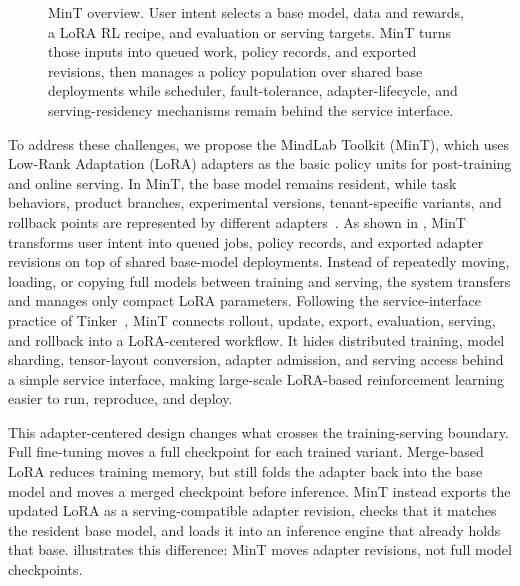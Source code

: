 \documentclass{llmxive}
\begin{document}
\begin{figure}[!htbp]
{}
    \caption{MinT overview. User intent selects a base model, data and rewards, a LoRA RL recipe, and evaluation or serving targets. MinT turns those inputs into queued work, policy records, and exported revisions, then manages a policy population over shared base deployments while scheduler, fault-tolerance, adapter-lifecycle, and serving-residency mechanisms remain behind the service interface.}
    \label{fig:mint_overview}
\end{figure}

To address these challenges, we propose the MindLab Toolkit (MinT), which uses Low-Rank Adaptation (LoRA) adapters as the basic policy units for post-training and online serving. In MinT, the base model remains resident, while task behaviors, product branches, experimental versions, tenant-specific variants, and rollback points are represented by different adapters~\citep{lora2022,lora_without_regret_2025}. As shown in , MinT transforms user intent into queued jobs, policy records, and exported adapter revisions on top of shared base-model deployments. Instead of repeatedly moving, loading, or copying full models between training and serving, the system transfers and manages only compact LoRA parameters. Following the service-interface practice of Tinker~\citep{tinker2025,tinker_cookbook}, MinT connects rollout, update, export, evaluation, serving, and rollback into a LoRA-centered workflow. It hides distributed training, model sharding, tensor-layout conversion, adapter admission, and serving access behind a simple service interface, making large-scale LoRA-based reinforcement learning easier to run, reproduce, and deploy.

This adapter-centered design changes what crosses the training-serving boundary. Full fine-tuning moves a full checkpoint for each trained variant. Merge-based LoRA reduces training memory, but still folds the adapter back into the base model and moves a merged checkpoint before inference. MinT instead exports the updated LoRA as a serving-compatible adapter revision, checks that it matches the resident base model, and loads it into an inference engine that already holds that base.  illustrates this difference: MinT moves adapter revisions, not full model checkpoints.
\end{document}
